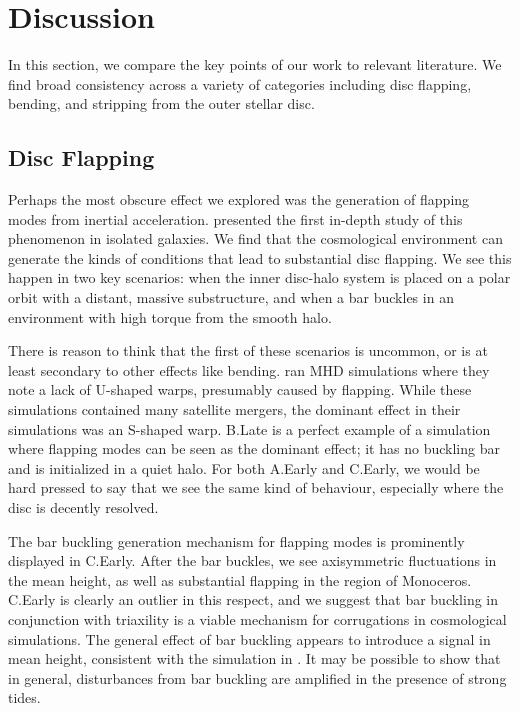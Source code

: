 \section{Discussion} \label{sec:discussion}

In this section, we compare the key points of our work to relevant literature. We find broad consistency across a variety of categories including disc flapping, bending, and stripping from the outer stellar disc.

\subsection{Disc Flapping}

Perhaps the most obscure effect we explored was the generation of flapping modes from inertial acceleration. \citet{sellwood_1996} presented the first in-depth study of this phenomenon in isolated galaxies. We find that the cosmological environment can generate the kinds of conditions that lead to substantial disc flapping. We see this happen in two key scenarios: when the inner disc-halo system is placed on a polar orbit with a distant, massive substructure, and when a bar buckles in an environment with high torque from the smooth halo. 

There is reason to think that the first of these scenarios is uncommon, or is at least secondary to other effects like bending. \citet{gomez_2017} ran MHD simulations where they note a lack of U-shaped warps, presumably caused by flapping. While these simulations contained many satellite mergers, the dominant effect in their simulations was an S-shaped warp. B.Late is a perfect example of a simulation where flapping modes can be seen as the dominant effect; it has no buckling bar and is initialized in a quiet halo. For both A.Early and C.Early, we would be hard pressed to say that we see the same kind of behaviour, especially where the disc is decently resolved.

The bar buckling generation mechanism for flapping modes is prominently displayed in C.Early. After the bar buckles, we see axisymmetric fluctuations in the mean height, as well as substantial flapping in the region of Monoceros. C.Early is clearly an outlier in this respect, and we suggest that bar buckling in conjunction with triaxility is a viable mechanism for corrugations in cosmological simulations. The general effect of bar buckling appears to introduce a signal in mean height, consistent with the simulation in \citet{bar_buckling_echo}. It may be possible to show that in general, disturbances from bar buckling are amplified in the presence of strong tides.

